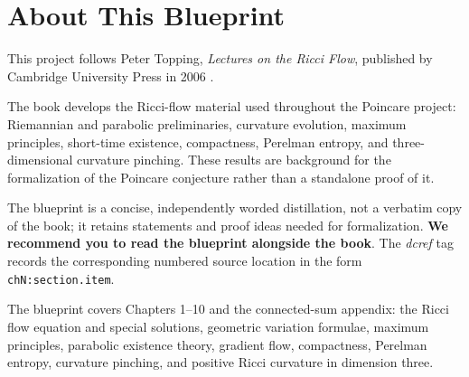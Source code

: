

\chapter*{About This Blueprint}

This project follows Peter Topping, \emph{Lectures on the Ricci Flow},
published by Cambridge University Press in 2006 \cite{topping2006ricci}.

The book develops the Ricci-flow material used throughout the Poincare project:
Riemannian and parabolic preliminaries, curvature evolution, maximum
principles, short-time existence, compactness, Perelman entropy, and
three-dimensional curvature pinching. These results are background for the
formalization of the Poincare conjecture rather than a standalone proof of it.

The blueprint is a concise, independently worded distillation, not a verbatim
copy of the book; it retains statements and proof ideas needed for
formalization. \textbf{We recommend you to read the blueprint alongside the
book}. The \emph{dcref} tag records the corresponding numbered source location
in the form \texttt{chN:section.item}.

The blueprint covers Chapters 1--10 and the connected-sum appendix: the Ricci
flow equation and special solutions, geometric variation formulae, maximum
principles, parabolic existence theory, gradient flow, compactness, Perelman
entropy, curvature pinching, and positive Ricci curvature in dimension three.











\appendix

